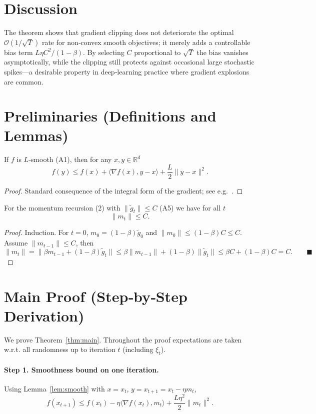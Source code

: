 \documentclass{article}
\newcommand{\R}{\mathbb{R}}
\begin{document}
\section*{Discussion}
The theorem shows that gradient clipping does not deteriorate the optimal $\mathcal{O}(1/\sqrt{T})$ rate for non‑convex smooth objectives; it merely adds a controllable bias term $L\eta C^2/(1-\beta)$. By selecting $C$ proportional to $\sqrt{T}$ the bias vanishes asymptotically, while the clipping still protects against occasional large stochastic spikes—a desirable property in deep‑learning practice where gradient explosions are common.

\newpage

\section*{Preliminaries (Definitions and Lemmas)}
\begin{lemma}\label{lem:smooth}
If $f$ is $L$‑smooth (A1), then for any $x,y\in\R^{d}$
\[
f(y)\le f(x)+\langle\nabla f(x),y-x\rangle+\frac{L}{2}\|y-x\|^2 .
\tag{L1}
\]
\end{lemma}
\begin{proof}
Standard consequence of the integral form of the gradient; see e.g.~\cite{nesterov}.
\end{proof}

\begin{lemma}\label{lem:momentum}
For the momentum recursion (2) with $\|\tilde g_t\|\le C$ (A5) we have for all $t$
\[
\|m_t\|\le C .
\tag{L2}
\]
\end{lemma}
\begin{proof}
Induction. For $t=0$, $m_0=(1-\beta)\tilde g_0$ and $\|m_0\|\le (1-\beta)C\le C$. Assume $\|m_{t-1}\|\le C$, then
\[
\|m_t\| = \|\beta m_{t-1}+(1-\beta)\tilde g_t\|
\le \beta\|m_{t-1}\|+(1-\beta)\|\tilde g_t\|
\le \beta C+(1-\beta)C = C .
\qquad\blacksquare
\]
\end{proof}

\section*{Main Proof (Step‑by‑Step Derivation)}
We prove Theorem~\ref{thm:main}. Throughout the proof expectations are taken w.r.t. all randomness up to iteration $t$ (including $\xi_t$).

\paragraph{Step 1. Smoothness bound on one iteration.}  
Using Lemma~\ref{lem:smooth} with $x=x_t$, $y=x_{t+1}=x_t-\eta m_t$,
\[
f(x_{t+1})\le f(x_t)-\eta\langle\nabla f(x_t),m_t\rangle+\frac{L\eta^2}{2}\|m_t\|^2 .
\tag{S1}
\]
\end{document}
